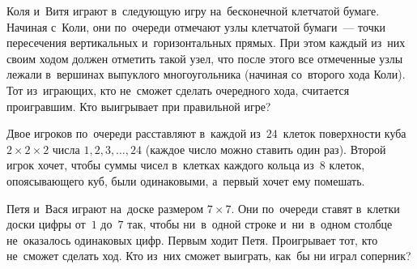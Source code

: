 \begin{problems}
\item
Коля и~Витя играют в~следующую игру на~бесконечной клетчатой бумаге.
Начиная с~Коли, они по~очереди отмечают узлы клетчатой бумаги~--- точки
пересечения вертикальных и~горизонтальных прямых.
При этом каждый из~них своим ходом должен отметить такой узел, что после этого
все отмеченные узлы лежали в~вершинах выпуклого многоугольника
(начиная со~второго хода Коли).
Тот из~играющих, кто не~сможет сделать очередного хода, считается проигравшим.
Кто выигрывает при правильной игре?

\item
Двое игроков по~очереди расставляют в~каждой из~$24$~клеток поверхности куба
$2 \times 2 \times 2 $ числа $1, 2, 3, \ldots, 24$
(каждое число можно ставить один раз).
Второй игрок хочет, чтобы суммы чисел в~клетках каждого кольца из~8 клеток,
опоясывающего куб, были одинаковыми, а~первый хочет ему помешать.


\item
Петя и~Вася играют на~доске размером $7 \times 7$.
Они по~очереди ставят в~клетки доски цифры от~$1$ до~$7$ так, чтобы ни~в~одной
строке и~ни~в~одном столбце не~оказалось одинаковых цифр.
Первым ходит Петя.
Проигрывает тот, кто не~сможет сделать ход.
Кто из~них сможет выиграть, как~бы ни играл соперник?

\end{problems}

